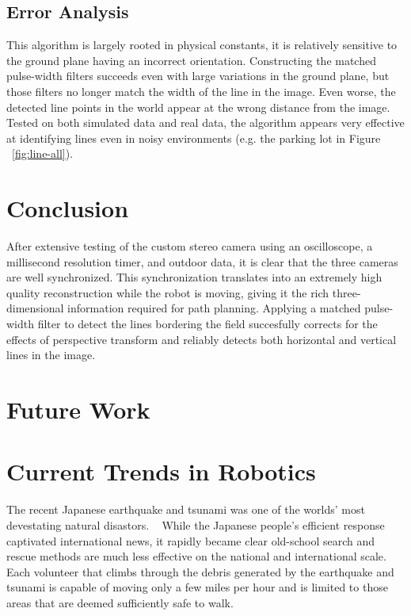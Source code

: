 \documentclass[11pt,twocolumn]{article}
\begin{document}
\subsection{Error Analysis}
\label{sec:line-error}
This algorithm is largely rooted in physical constants, it is relatively sensitive to the ground plane having an incorrect orientation. Constructing the matched pulse-width filters succeeds even with large variations in the ground plane, but those filters no longer match the width of the line in the image. Even worse, the detected line points in the world appear at the wrong distance from the image. Tested on both simulated data and real data, the algorithm appears very effective at identifying lines even in noisy environments (e.g. the parking lot in Figure ~\ref{fig:line-all}).

\section{Conclusion}
\label{sec:conclusion}
After extensive testing of the custom stereo camera using an oscilloscope, a millisecond resolution timer, and outdoor data, it is clear that the three cameras are well synchronized. This synchronization translates into an extremely high quality reconstruction while the robot is moving, giving it the rich three-dimensional information required for path planning. Applying a matched pulse-width filter to detect the lines bordering the field succesfully corrects for the effects of perspective transform and reliably detects both horizontal and vertical lines in the image. 

\section{Future Work}

\label{sec:future}

\section{Current Trends in Robotics}
\label{sec:econ}
The recent Japanese earthquake and tsunami was one of the worlds' most
devestating natural disastors. ~\cite{????} While the Japanese people's
efficient response captivated international news, it rapidly became clear
old-school search and rescue methods are much less effective on the national
and international scale. Each volunteer that climbs through the debris
generated by the earthquake and tsunami is capable of moving only a few miles
per hour and is limited to those areas that are deemed sufficiently safe to
walk.
\end{document}
